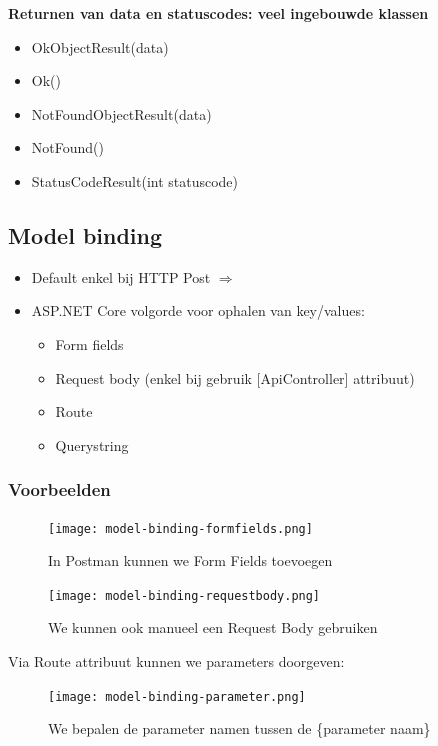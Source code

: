 \documentclass{article}
\begin{document}
\textbf{Returnen van data en statuscodes: veel ingebouwde klassen}

\begin{itemize}
    \item OkObjectResult(data)
    \item Ok()
    \item NotFoundObjectResult(data)
    \item NotFound()
    \item StatusCodeResult(int statuscode)
\end{itemize}

\subsection{Model binding}

\begin{itemize}
    \item Default enkel bij HTTP Post $\Rightarrow$
    \item ASP.NET Core volgorde voor ophalen van key/values:
    \begin{itemize}
        \item Form fields
        \item Request body (enkel bij gebruik [ApiController] attribuut)
        \item Route
        \item Querystring
    \end{itemize}
\end{itemize}

\subsubsection{Voorbeelden}

\begin{figure}[H]
    \centering
    \texttt{[image: model-binding-formfields.png]}
    \caption{In Postman kunnen we Form Fields toevoegen}
\end{figure}

\begin{figure}[H]
    \centering
    \texttt{[image: model-binding-requestbody.png]}
    \caption{We kunnen ook manueel een Request Body gebruiken}
\end{figure}

Via Route attribuut kunnen we parameters doorgeven:

\begin{figure}[H]
    \centering
    \texttt{[image: model-binding-parameter.png]}
    \caption{We bepalen de parameter namen tussen de \{parameter naam\}}
\end{figure}
\end{document}
